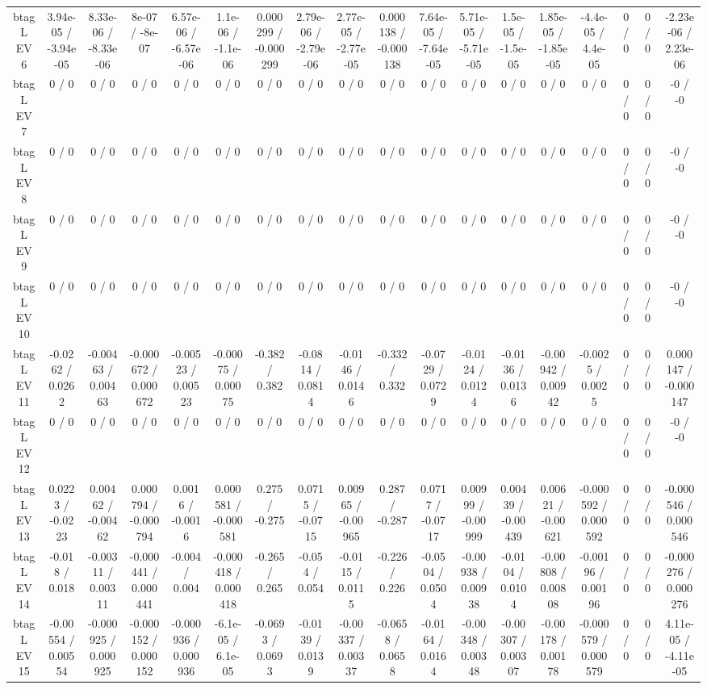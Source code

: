 \documentclass[10pt]{article}
\begin{document}
\begin{table}[htbp]
\begin{center}
\begin{tabular}{|c|c|c|c|c|c|c|c|c|c|c|c|c|c|c|c|c|c|}
  btag L EV 6 & 3.94e-05 / -3.94e-05 & 8.33e-06 / -8.33e-06 & 8e-07 / -8e-07 & 6.57e-06 / -6.57e-06 & 1.1e-06 / -1.1e-06 & 0.000299 / -0.000299 & 2.79e-06 / -2.79e-06 & 2.77e-05 / -2.77e-05 & 0.000138 / -0.000138 & 7.64e-05 / -7.64e-05 & 5.71e-05 / -5.71e-05 & 1.5e-05 / -1.5e-05 & 1.85e-05 / -1.85e-05 & -4.4e-05 / 4.4e-05 & 0 / 0 & 0 / 0 & -2.23e-06 / 2.23e-06 \\ 
  btag L EV 7 & 0 / 0 & 0 / 0 & 0 / 0 & 0 / 0 & 0 / 0 & 0 / 0 & 0 / 0 & 0 / 0 & 0 / 0 & 0 / 0 & 0 / 0 & 0 / 0 & 0 / 0 & 0 / 0 & 0 / 0 & 0 / 0 & -0 / -0 \\ 
  btag L EV 8 & 0 / 0 & 0 / 0 & 0 / 0 & 0 / 0 & 0 / 0 & 0 / 0 & 0 / 0 & 0 / 0 & 0 / 0 & 0 / 0 & 0 / 0 & 0 / 0 & 0 / 0 & 0 / 0 & 0 / 0 & 0 / 0 & -0 / -0 \\ 
  btag L EV 9 & 0 / 0 & 0 / 0 & 0 / 0 & 0 / 0 & 0 / 0 & 0 / 0 & 0 / 0 & 0 / 0 & 0 / 0 & 0 / 0 & 0 / 0 & 0 / 0 & 0 / 0 & 0 / 0 & 0 / 0 & 0 / 0 & -0 / -0 \\ 
  btag L EV 10 & 0 / 0 & 0 / 0 & 0 / 0 & 0 / 0 & 0 / 0 & 0 / 0 & 0 / 0 & 0 / 0 & 0 / 0 & 0 / 0 & 0 / 0 & 0 / 0 & 0 / 0 & 0 / 0 & 0 / 0 & 0 / 0 & -0 / -0 \\ 
  btag L EV 11 & -0.0262 / 0.0262 & -0.00463 / 0.00463 & -0.000672 / 0.000672 & -0.00523 / 0.00523 & -0.00075 / 0.00075 & -0.382 / 0.382 & -0.0814 / 0.0814 & -0.0146 / 0.0146 & -0.332 / 0.332 & -0.0729 / 0.0729 & -0.0124 / 0.0124 & -0.0136 / 0.0136 & -0.00942 / 0.00942 & -0.0025 / 0.0025 & 0 / 0 & 0 / 0 & 0.000147 / -0.000147 \\ 
  btag L EV 12 & 0 / 0 & 0 / 0 & 0 / 0 & 0 / 0 & 0 / 0 & 0 / 0 & 0 / 0 & 0 / 0 & 0 / 0 & 0 / 0 & 0 / 0 & 0 / 0 & 0 / 0 & 0 / 0 & 0 / 0 & 0 / 0 & -0 / -0 \\ 
  btag L EV 13 & 0.0223 / -0.0223 & 0.00462 / -0.00462 & 0.000794 / -0.000794 & 0.0016 / -0.0016 & 0.000581 / -0.000581 & 0.275 / -0.275 & 0.0715 / -0.0715 & 0.00965 / -0.00965 & 0.287 / -0.287 & 0.0717 / -0.0717 & 0.00999 / -0.00999 & 0.00439 / -0.00439 & 0.00621 / -0.00621 & -0.000592 / 0.000592 & 0 / 0 & 0 / 0 & -0.000546 / 0.000546 \\ 
  btag L EV 14 & -0.018 / 0.018 & -0.00311 / 0.00311 & -0.000441 / 0.000441 & -0.004 / 0.004 & -0.000418 / 0.000418 & -0.265 / 0.265 & -0.054 / 0.054 & -0.0115 / 0.0115 & -0.226 / 0.226 & -0.0504 / 0.0504 & -0.00938 / 0.00938 & -0.0104 / 0.0104 & -0.00808 / 0.00808 & -0.00196 / 0.00196 & 0 / 0 & 0 / 0 & -0.000276 / 0.000276 \\ 
  btag L EV 15 & -0.00554 / 0.00554 & -0.000925 / 0.000925 & -0.000152 / 0.000152 & -0.000936 / 0.000936 & -6.1e-05 / 6.1e-05 & -0.0693 / 0.0693 & -0.0139 / 0.0139 & -0.00337 / 0.00337 & -0.0658 / 0.0658 & -0.0164 / 0.0164 & -0.00348 / 0.00348 & -0.00307 / 0.00307 & -0.00178 / 0.00178 & -0.000579 / 0.000579 & 0 / 0 & 0 / 0 & 4.11e-05 / -4.11e-05 \\ 

\end{tabular}
\end{center}
\end{table}
\end{document}

